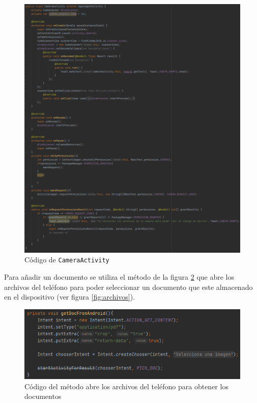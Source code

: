 \begin{figure}[H]
    \centering
    \includegraphics[width=\textwidth]{Images/Capitulo7/cameraact1.png}
    \caption{Código de \texttt{CameraActivity}}
    \label{fig:cameraact1}
\end{figure}

Para añadir un documento se utiliza el método de la figura \ref{fig:getdocfrom} que abre los archivos del teléfono para poder seleccionar un documento que este almacenado en el dispositivo (ver figura \ref{fig:archivos}).

\begin{figure}[H]
    \centering
    \includegraphics[width=\textwidth]{Images/Capitulo7/getdocfrom.png}
        \caption{Código del método abre los archivos del teléfono para obtener los documentos}
    \label{fig:getdocfrom}
\end{figure}

